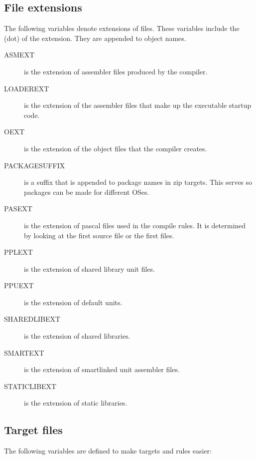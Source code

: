 \documentclass{report}
\begin{document}
\subsection{File extensions}

The following variables denote extensions of files. These variables include
the  (dot) of the extension. They are appended to object names.

\begin{description}
\item[ASMEXT] is the extension of assembler files produced by the compiler.
\item[LOADEREXT] is the extension of the assembler files that make up the
executable startup code.
\item[OEXT] is the extension of the  object files that the compiler creates.
\item[PACKAGESUFFIX] is a suffix that is appended to package names in zip
targets. This serves so packages can be made for different OSes.
\item[PASEXT] is the extension of pascal files used in the compile rules.
It is determined by looking at the first  source file or 
the first  files.
\item[PPLEXT] is the extension of shared library unit files.
\item[PPUEXT] is the extension of default units.
\item[SHAREDLIBEXT] is the extension of shared libraries.
\item[SMARTEXT] is the extension of smartlinked unit assembler files.
\item[STATICLIBEXT] is the extension of static libraries.
\end{description}

\subsection{Target files}

The following variables are defined to make targets and rules easier:
\end{document}
